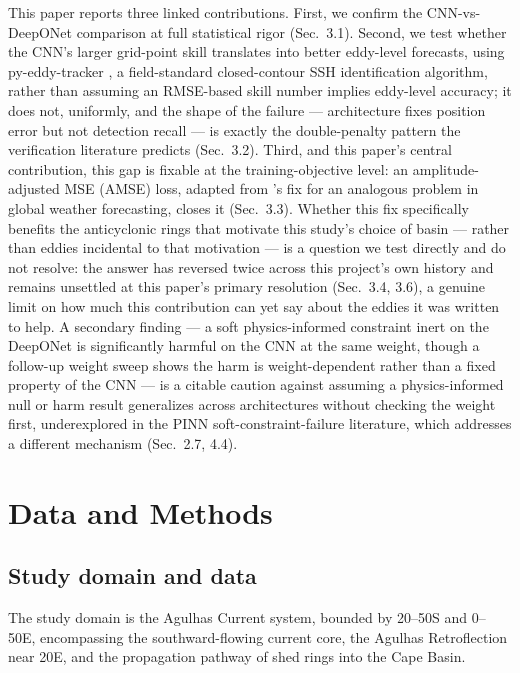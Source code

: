 \documentclass[11pt]{article}
\begin{document}
This paper reports three linked contributions. First, we confirm the CNN-vs-DeepONet comparison at full statistical rigor (Sec.~3.1). Second, we test whether the CNN's larger grid-point skill translates into better eddy-level forecasts, using py-eddy-tracker \citep[]{Mason2014}, a field-standard closed-contour SSH identification algorithm, rather than assuming an RMSE-based skill number implies eddy-level accuracy; it does not, uniformly, and the shape of the failure --- architecture fixes position error but not detection recall --- is exactly the double-penalty pattern the verification literature predicts (Sec.~3.2). Third, and this paper's central contribution, this gap is fixable at the training-objective level: an amplitude-adjusted MSE (AMSE) loss, adapted from \citet{Subich2025}'s fix for an analogous problem in global weather forecasting, closes it (Sec.~3.3). Whether this fix specifically benefits the anticyclonic rings that motivate this study's choice of basin --- rather than eddies incidental to that motivation --- is a question we test directly and do not resolve: the answer has reversed twice across this project's own history and remains unsettled at this paper's primary resolution (Sec.~3.4, 3.6), a genuine limit on how much this contribution can yet say about the eddies it was written to help. A secondary finding --- a soft physics-informed constraint inert on the DeepONet is significantly harmful on the CNN at the same weight, though a follow-up weight sweep shows the harm is weight-dependent rather than a fixed property of the CNN --- is a citable caution against assuming a physics-informed null or harm result generalizes across architectures without checking the weight first, underexplored in the PINN soft-constraint-failure literature, which addresses a different mechanism \citep[]{Wang2022,Krishnapriyan2021} (Sec.~2.7, 4.4).

\section{Data and Methods}

\subsection{Study domain and data}

The study domain is the Agulhas Current system, bounded by 20\textdegree--50\textdegree S and 0\textdegree--50\textdegree E, encompassing the southward-flowing current core, the Agulhas Retroflection near 20\textdegree E, and the propagation pathway of shed rings into the Cape Basin.
\end{document}
